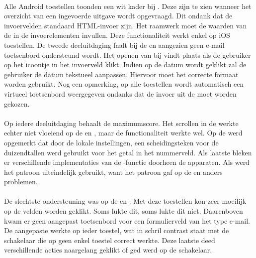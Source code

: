 \paragraph{\kendo}
Alle Android toestellen toonden een wit kader bij  .
Deze zijn te zien wanneer het overzicht van een ingevoerde uitgave wordt opgevraagd.
Dit ondank dat de invoervelden standaard HTML-invoer zijn.
Het raamwerk moet de waarden van de  in de  invoerelementen invullen.
Deze functionaliteit werkt enkel op iOS toestellen.
De tweede deeluitdaging faalt bij de \htc{} en \gtab{} aangezien geen e-mail toetsenbord ondersteund wordt.
Het openen van  bij \kendo{} vindt plaats als de gebruiker op het icoontje in het invoerveld klikt.
Indien op de datum wordt geklikt zal de gebruiker de datum tekstueel aanpassen.  
Hiervoor moet het correcte formaat worden gebruikt.
Nog een opmerking,  op alle toestellen wordt automatisch een virtueel toetsenbord weergegeven ondanks dat de invoer uit de  moet worden gekozen.

\paragraph{\jqm}
Op iedere deeluitdaging behaalt \jqm{} de maximumscore.
Het scrollen in de  werkte echter niet vloeiend op de \htc{} en \gtab{}, maar de functionaliteit werkte wel.
Op de \ipadi{} werd opgemerkt dat door de lokale instellingen, een scheidingsteken voor de duizendtallen werd gebruikt voor het getal in het nummerveld.
Als laatste bleken er verschillende implementaties van de \js{}-functie  doorheen de apparaten.
Als  werd het patroon  uiteindelijk gebruikt, want het patroon  gaf op de \htc{} en \gtab{} anders problemen.

\paragraph{\lungo}
De slechtste ondersteuning was op de \htc{} en \gtab{}.
Met deze toestellen kon zeer moeilijk op de velden worden geklikt.
Soms lukte dit, soms lukte dit niet.
Daarenboven kwam er geen aangepast toetsenbord voor een formulierveld van het type e-mail.
De aangepaste  werkte op ieder toestel, wat in schril contrast staat met de schakelaar die op geen enkel toestel correct werkte.
Deze laatste deed verschillende acties naargelang geklikt of ged werd op de schakelaar.

